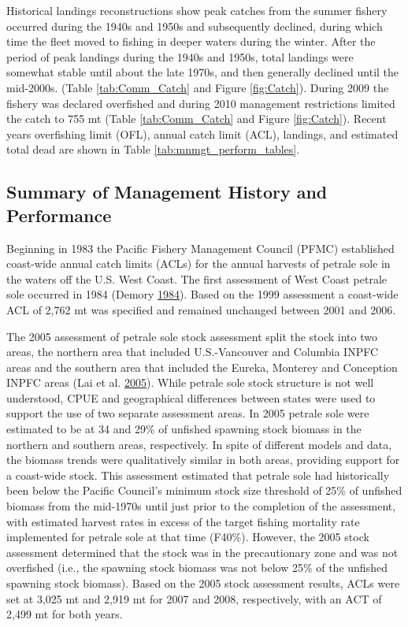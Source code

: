 \documentclass[12pt,]{article}
\begin{document}
Historical landings reconstructions show peak catches from the summer
fishery occurred during the 1940s and 1950s and subsequently declined,
during which time the fleet moved to fishing in deeper waters during the
winter. After the period of peak landings during the 1940s and 1950s,
total landings were somewhat stable until about the late 1970s, and then
generally declined until the mid-2000s. (Table \ref{tab:Comm_Catch} and
Figure \ref{fig:Catch}). During 2009 the fishery was declared overfished
and during 2010 management restrictions limited the catch to 755 mt
(Table \ref{tab:Comm_Catch} and Figure \ref{fig:Catch}). Recent years
overfishing limit (OFL), annual catch limit (ACL), landings, and
estimated total dead are shown in Table \ref{tab:mnmgt_perform_tables}.

\subsection{Summary of Management History and
Performance}\label{summary-of-management-history-and-performance}

Beginning in 1983 the Pacific Fishery Management Council (PFMC)
established coast-wide annual catch limits (ACLs) for the annual
harvests of petrale sole in the waters off the U.S. West Coast. The
first assessment of West Coast petrale sole occurred in 1984 (Demory
\protect\hyperlink{ref-demory_progress_1984}{1984}). Based on the 1999
assessment a coast-wide ACL of 2,762 mt was specified and remained
unchanged between 2001 and 2006.

The 2005 assessment of petrale sole stock assessment split the stock
into two areas, the northern area that included U.S.-Vancouver and
Columbia INPFC areas and the southern area that included the Eureka,
Monterey and Conception INPFC areas (Lai et al.
\protect\hyperlink{ref-lai_stock_2005}{2005}). While petrale sole stock
structure is not well understood, CPUE and geographical differences
between states were used to support the use of two separate assessment
areas. In 2005 petrale sole were estimated to be at 34 and 29\% of
unfished spawning stock biomass in the northern and southern areas,
respectively. In spite of different models and data, the biomass trends
were qualitatively similar in both areas, providing support for a
coast-wide stock. This assessment estimated that petrale sole had
historically been below the Pacific Council's minimum stock size
threshold of 25\% of unfished biomass from the mid-1970s until just
prior to the completion of the assessment, with estimated harvest rates
in excess of the target fishing mortality rate implemented for petrale
sole at that time (F40\%). However, the 2005 stock assessment determined
that the stock was in the precautionary zone and was not overfished
(i.e., the spawning stock biomass was not below 25\% of the unfished
spawning stock biomass). Based on the 2005 stock assessment results,
ACLs were set at 3,025 mt and 2,919 mt for 2007 and 2008, respectively,
with an ACT of 2,499 mt for both years.
\end{document}
